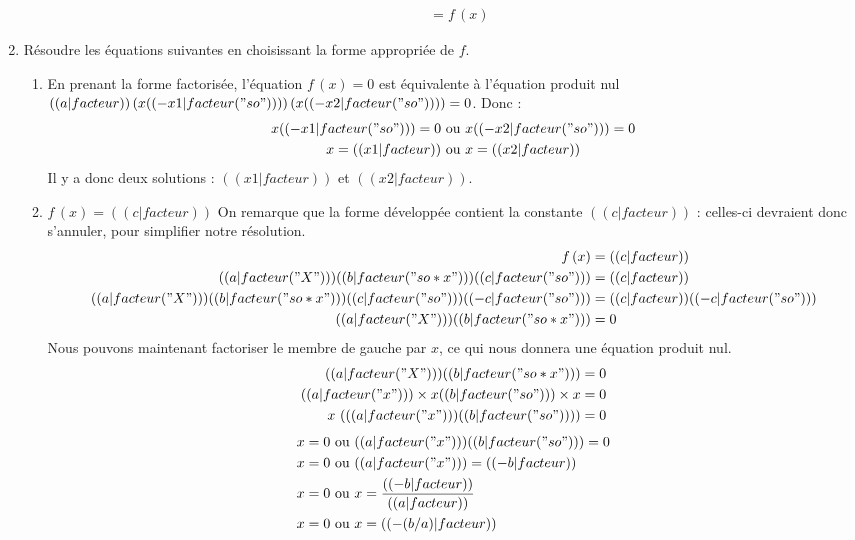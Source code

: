 \begin{enumerate}
\begin{enumerate}
\begin{align*}
            &= f\,(x)
        \end{align*}
\end{enumerate}
\item Résoudre les équations suivantes en choisissant la forme appropriée de $f$.
\begin{enumerate}
\item En prenant la forme factorisée, l'équation $f\,(x)=0$ est équivalente à l'équation produit nul $(( a|facteur ))\,(x (( -x1|facteur("so") )) )\,(x (( -x2|facteur("so") )) ) = 0$. Donc :
\begin{align*}
x (( -x1|facteur("so") ))=0 &\text{ ou } x (( -x2|facteur("so") ))=0 \\
x=(( x1|facteur )) &\text{ ou } x=(( x2|facteur ))
\end{align*}
Il y a donc deux solutions : $(( x1|facteur ))$ et $(( x2|facteur ))$.
\item $f\,(x)=(( c|facteur ))$ On remarque que la forme développée contient la constante $(( c|facteur ))$ : celles-ci devraient donc s'annuler, pour simplifier notre résolution.
\begin{align*}
f\,(x) &= (( c|facteur )) \\
(( a|facteur("X") )) (( b|facteur("so*x") )) (( c|facteur("so") )) &= (( c|facteur )) \\
(( a|facteur("X") )) (( b|facteur("so*x") )) (( c|facteur("so") )) (( -c|facteur("so") )) &= (( c|facteur )) (( -c|facteur("so") )) \\
(( a|facteur("X") )) (( b|facteur("so*x") )) &= 0 \\
\end{align*}
Nous pouvons maintenant factoriser le membre de gauche par $x$, ce qui nous donnera une équation produit nul.
\begin{align*}
(( a|facteur("X") )) (( b|facteur("so*x") )) &= 0 \\
(( a|facteur("x") ))\times{} x (( b|facteur("so") ))\times{} x &= 0 \\
x\,\left( (( a|facteur("x") )) (( b|facteur("so") )) \right) &= 0 \\
\end{align*}
\begin{align*}
x =0 &\text{ ou } (( a|facteur("x") )) (( b|facteur("so") ))=0 \\
x =0 &\text{ ou } (( a|facteur("x") )) =(( -b|facteur )) \\
x =0 &\text{ ou } x = \frac{(( -b|facteur ))}{(( a|facteur ))} \\
x =0 &\text{ ou } x = (( -(b/a)|facteur )) \\

\end{align*}
\end{enumerate}
\end{enumerate}
